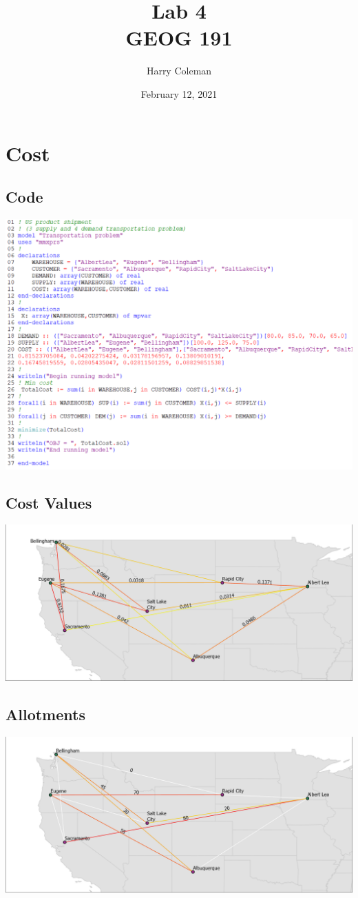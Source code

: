 \documentclass[12pt]{article}
\title{\vspace{-0.5in}Lab 4 \\
    \large GEOG 191
}
\author{Harry Coleman}
\date{February 12, 2021}
\theoremstyle{definition}
\begin{document}
\maketitle


\section{Cost}
\subsection{Code}
\includegraphics[width=\textwidth]{codecost.png}
\newpage
\subsection{Cost  Values}
\includegraphics[width=\textwidth]{mapcost.png}
\subsection{Allotments}
\includegraphics[width=\textwidth]{solmapcost.png}
\end{document}
